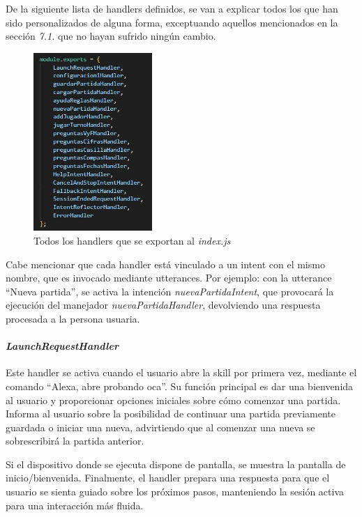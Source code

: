 De la siguiente lista de handlers definidos, se van a explicar todos los que han sido personalizados de alguna forma, exceptuando aquellos mencionados en la sección \textit{7.1.} que no hayan sufrido ningún cambio.
\begin{figure}[H]
	\centering
	\includegraphics[width=0.4\textwidth]{imgs/codigo-handlers-2.jpg}
	\caption{Todos los handlers que se exportan al \textit{index.js}}
	\label{fig:codigo-handlers-2}
\end{figure}

Cabe mencionar que cada handler está vinculado a un intent con el mismo nombre, que es invocado mediante utterances. Por ejemplo: con la utterance \enquote{Nueva partida}, se activa la intención \textit{nuevaPartidaIntent}, que provocará la ejecución del manejador \textit{nuevaPartidaHandler}, devolviendo una respuesta procesada a la persona usuaria.

\paragraph{\textit{LaunchRequestHandler}}

Este handler se activa cuando el usuario abre la skill por primera vez, mediante el comando \enquote{Alexa, abre probando oca}. Su función principal es dar una bienvenida al usuario y proporcionar opciones iniciales sobre cómo comenzar una partida. Informa al usuario sobre la posibilidad de continuar una partida previamente guardada o iniciar una nueva, advirtiendo que al comenzar una nueva se sobrescribirá la partida anterior. 

Si el dispositivo donde se ejecuta dispone de pantalla, se muestra la pantalla de inicio/bienvenida. Finalmente, el handler prepara una respuesta para que el usuario se sienta guiado sobre los próximos pasos, manteniendo la sesión activa para una interacción más fluida.

